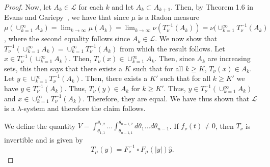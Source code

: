 \documentclass{amsart}
\theoremstyle{lemma}
\theoremstyle{remark}
\begin{document}
\begin{proof}
Now, let $A_k \in \mathcal{L}$ for each $k$ and let $A_{k} \subset A_{k+1}$. Then, by Theorem 1.6 in Evans and Gariepy~\cite{evansgariepy}, we have that since $\mu$ is a Radon measure $\mu(\cup_{k=1}^{\infty} A_k) = \lim_{k \rightarrow \infty} \mu(A_k) = \lim_{k \rightarrow \infty} \nu(T_{\nu}^{-1}(A_k)) = \nu (\cup_{k=1}^{\infty} T_{\nu}^{-1}(A_k)$, where the second equality follows since $A_k \in \mathcal{L}$. We now show that $T_{\nu}^{-1}(\cup_{k=1}^{\infty} A_k) = \cup_{k=1}^{\infty} T_{\nu}^{-1}(A_k)$ from which the result follows. Let $x \in T_{\nu}^{-1}(\cup_{k=1}^{\infty} A_k)$. Then, $T_{\nu}(x) \in \cup_{k=1}^{\infty} A_k$. Then, since $A_k$ are increasing sets, this then says that there exists a $K$ such that for all $k \geq K$, $T_{\nu}(x) \in A_k$. Let $y \in \cup_{k=1}^{\infty} T_{\nu}^{-1}(A_k)$. Then, there exists a $K'$ such that for all $k \geq K'$ we have $y \in T_{\nu}^{-1}(A_k)$. Thus, $T_{\nu}(y) \in A_k$ for $k \geq K'$. Thus, $y \in T_{\nu}^{-1}(\cup_{k=1}^{\infty} A_k)$ and $x \in \cup_{k=1}^{\infty} T_{\nu}^{-1}(A_k)$. Therefore, they are equal. We have thus shown that $\mathcal{L}$ is a $\lambda$-system and therefore the claim follows.


We define the quantity $V = \int_{\theta_{1, 1}}^{\theta_{1, 2}} \dots \int_{\theta_{n-1, 1}}^{\theta_{n-1, 2}} d\theta_{1} \dots d\theta_{n-1}$. If $f_{\nu}(t) \neq 0$, then $T_{\nu}$ is invertible and is given by
\begin{equation}
T_{\mu}(y) = F_{\nu}^{-1} \circ F_{\mu}(\vert y \vert) \hat{y}.
\end{equation}


\end{proof}
\end{document}
